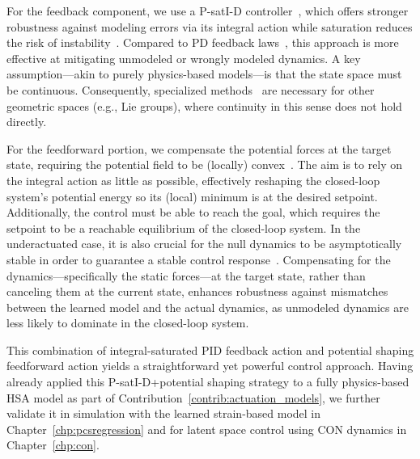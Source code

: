 For the feedback component, we use a P-satI-D controller~\citep{pustina2022p}, which offers stronger robustness against modeling errors via its integral action while saturation reduces the risk of instability~\citep{pustina2022p}. Compared to PD feedback laws~\citep{della2020model}, this approach is more effective at mitigating unmodeled or wrongly modeled dynamics.
%
A key assumption—akin to purely physics-based models—is that the state space must be continuous. Consequently, specialized methods~\citep{maithripala2015intrinsic} are necessary for other geometric spaces (e.g., Lie groups), where continuity in this sense does not hold directly.

For the feedforward portion, we compensate the potential forces at the target state, requiring the potential field to be (locally) convex~\citep{borja2022energy, della2023model}. The aim is to rely on the integral action as little as possible, effectively reshaping the closed-loop system’s potential energy so its (local) minimum is at the desired setpoint. 
Additionally, the control must be able to reach the goal, which requires the setpoint to be a reachable equilibrium of the closed-loop system. In the underactuated case, it is also crucial for the null dynamics to be asymptotically stable in order to guarantee a stable control response~\citep{borja2022energy}.
Compensating for the dynamics—specifically the static forces—at the target state, rather than canceling them at the current state, enhances robustness against mismatches between the learned model and the actual dynamics, as unmodeled dynamics are less likely to dominate in the closed-loop system.

This combination of integral-saturated PID feedback action and potential shaping feedforward action yields a straightforward yet powerful control approach.
%
Having already applied this P-satI-D+potential shaping strategy to a fully physics-based \gls{HSA} model as part of Contribution~\ref{contrib:actuation_models}, we further validate it in simulation with the learned strain-based model in Chapter~\ref{chp:pcsregression} and for latent space control using \gls{CON} dynamics in Chapter~\ref{chp:con}.


